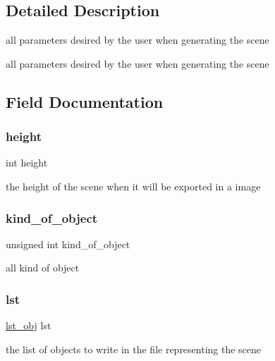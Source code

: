 \subsection{Detailed Description}
all parameters desired by the user when generating the scene 

all parameters desired by the user when generating the scene 

\subsection{Field Documentation}
\mbox{\label{struct_scene__info_ad12fc34ce789bce6c8a05d8a17138534}} 
\subsubsection{\texorpdfstring{height}{height}}
{\footnotesize\ttfamily int height}

the height of the scene when it will be exported in a image \mbox{\label{struct_scene__info_a424ae246251dbf194cf480fd3b3eba60}} 
\subsubsection{\texorpdfstring{kind\+\_\+of\+\_\+object}{kind\_of\_object}}
{\footnotesize\ttfamily unsigned int kind\+\_\+of\+\_\+object}

all kind of object \mbox{\label{struct_scene__info_ab9f02bcf7c8c98ddd57f47e4d8035ac6}} 
\subsubsection{\texorpdfstring{lst}{lst}}
{\footnotesize\ttfamily \hyperlink{structlst__obj}{lst\+\_\+obj} lst}

the list of objects to write in the file representing the scene \mbox{\label{struct_scene__info_a5a69c7addc967ed8dbc9da830e1ab534}} 
